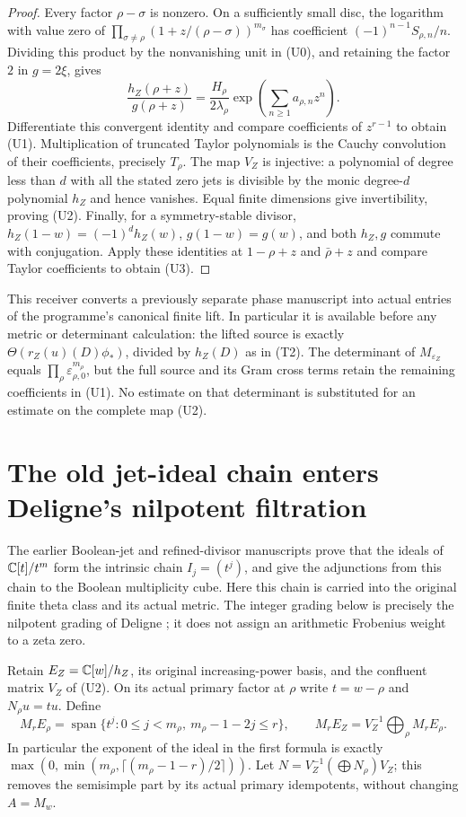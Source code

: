\documentclass[11pt]{article}
\begin{document}
\begin{proof}
Every factor $\rho-\sigma$ is nonzero. On a sufficiently small disc,
the logarithm with value zero of
$\prod_{\sigma\ne\rho}(1+z/(\rho-\sigma))^{m_\sigma}$ has
coefficient $(-1)^{n-1}S_{\rho,n}/n$. Dividing this product by the
nonvanishing unit in (U0), and retaining the factor $2$ in $g=2\xi$,
gives
\[
 \frac{h_Z(\rho+z)}{g(\rho+z)}
   =\frac{H_\rho}{2\lambda_\rho}
                        \exp\!\left(\sum_{n\geq1}a_{\rho,n}z^n\right).
\]
Differentiate this convergent identity and compare coefficients of
$z^{r-1}$ to obtain (U1). Multiplication of truncated Taylor polynomials
is the Cauchy convolution of their coefficients, precisely $T_\rho$.
The map $V_Z$ is injective: a polynomial of degree less than $d$ with
all the stated zero jets is divisible by the monic degree-$d$ polynomial
$h_Z$ and hence vanishes. Equal finite dimensions give invertibility,
proving (U2). Finally, for a symmetry-stable divisor,
$h_Z(1-w)=(-1)^d h_Z(w)$, $g(1-w)=g(w)$, and both $h_Z,g$ commute
with conjugation. Apply these identities at $1-\rho+z$ and
$\bar\rho+z$ and compare Taylor coefficients to obtain (U3).
\end{proof}

This receiver converts a previously separate phase manuscript into actual
entries of the programme's canonical finite lift. In particular it is
available before any metric or determinant calculation: the lifted source
is exactly
$\Theta(r_Z(u)(D)\phi_*)$, divided by $h_Z(D)$ as in (T2).
The determinant of $M_{\varepsilon_Z}$ equals
$\prod_\rho\varepsilon_{\rho,0}^{m_\rho}$, but the full source and
its Gram cross terms retain the remaining coefficients in (U1).
No estimate on that determinant is substituted for an estimate on the
complete map (U2).

\section{The old jet-ideal chain enters Deligne's nilpotent filtration}
The earlier Boolean-jet and refined-divisor manuscripts prove that the
ideals of $\mathbb C[t]/t^m$ form the intrinsic chain
$I_j=(t^j)$, and give the adjunctions from this chain to the Boolean
multiplicity cube. Here this chain is carried into the original finite
theta class and its actual metric. The integer grading below is precisely
the nilpotent grading of Deligne \cite[(1.6.1),(1.6.7)]{cr:DeligneII}; it
does not assign an arithmetic Frobenius weight to a zeta zero.

Retain $E_Z=\mathbb C[w]/h_Z$, its original increasing-power basis, and the
confluent matrix $V_Z$ of (U2). On its actual primary factor at $\rho$
write $t=w-\rho$ and $N_\rho u=tu$. Define
\[
 M_rE_\rho=
 \operatorname{span}\{t^j:0\leq j<m_\rho,\ m_\rho-1-2j\leq r\},
 \qquad M_rE_Z=V_Z^{-1}\!\bigoplus_\rho M_rE_\rho.
 \tag{N1}
\]
In particular the exponent of the ideal in the first formula is exactly
$\max(0,\min(m_\rho,\lceil(m_\rho-1-r)/2\rceil))$.
Let $N=V_Z^{-1}(\bigoplus N_\rho)V_Z$; this removes the semisimple
part by its actual primary idempotents, without changing $A=M_w$.
\end{document}
